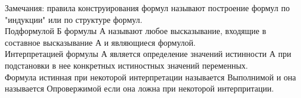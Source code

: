 \documentclass[a4paper, 12pt]{article}
\begin{document}
Замечания: правила конструирования формул называют построение формул по "индукции" или по структуре формул.\\

Подформулой Б формулы А называют любое высказывание, входящие в составное высказывание А и являющиеся формулой.\\

Интерпретацией формулы А является определение значений истинности А при подстановки в нее конкретных истиностных значений переменных.\\

Формула истинная при некоторой интерпретации называется Выполнимой и она называется Опровержимой если она ложна при некоторой интерпритации.
\end{document}
